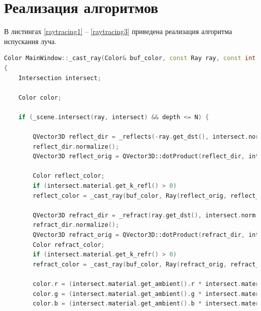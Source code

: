 \section{Реализация алгоритмов}

В листингах \ref{raytracing1}  -- \ref{raytracing3} приведена реализация алгоритма испускания луча.
\clearpage
\begin{lstlisting}[label=raytracing1,caption=Реализация алгоритма испускания луча (начало), language=C++]
Color MainWindow::_cast_ray(Color& buf_color, const Ray ray, const int depth)
{
	Intersection intersect;
	
	Color color;
	
	if (_scene.intersect(ray, intersect) && depth <= N) {
		
		QVector3D reflect_dir = _reflects(-ray.get_dst(), intersect.norm);
		reflect_dir.normalize();
		QVector3D reflect_orig = QVector3D::dotProduct(reflect_dir, intersect.norm) < 0 ? intersect.point - intersect.norm * 1e-3 : intersect.point + intersect.norm * 1e-3;
		
		Color reflect_color;
		if (intersect.material.get_k_refl() > 0)
		reflect_color = _cast_ray(buf_color, Ray(reflect_orig, reflect_dir), depth + 1);
		
		QVector3D refract_dir = _refract(ray.get_dst(), intersect.norm, intersect.material.get_refraction_index());
		refract_dir.normalize();
		QVector3D refract_orig = QVector3D::dotProduct(refract_dir, intersect.norm) < 0 ? intersect.point - intersect.norm * 1e-3 : intersect.point + intersect.norm * 1e-3;
		Color refract_color;
		if (intersect.material.get_k_refr() > 0)
		refract_color = _cast_ray(buf_color, Ray(refract_orig, refract_dir), depth + 1);
		
		color.r = (intersect.material.get_ambient().r * intersect.material.get_ka());
		color.g = (intersect.material.get_ambient().g * intersect.material.get_ka());
		color.b = (intersect.material.get_ambient().b * intersect.material.get_ka());
\end{lstlisting}
\clearpage
